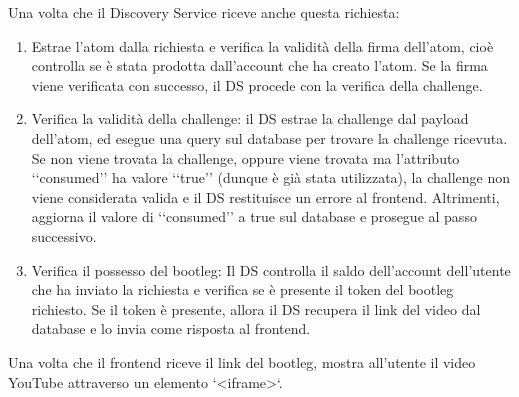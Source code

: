 Una volta che il Discovery Service riceve anche questa richiesta:
\begin{enumerate}
    \item Estrae l'atom dalla richiesta e verifica la validità della firma dell'atom, cioè controlla se è stata prodotta dall'account che ha creato l'atom. Se la firma viene verificata con successo, il DS procede con la verifica della challenge.
    \item Verifica la validità della challenge: il DS estrae la challenge dal payload dell'atom, ed esegue una query sul database per trovare la challenge ricevuta. Se non viene trovata la challenge, oppure viene trovata ma l'attributo ‘‘consumed’’ ha valore ‘‘true’’ (dunque è già stata utilizzata), la challenge non viene considerata valida e il DS restituisce un errore al frontend. Altrimenti, aggiorna il valore di ‘‘consumed’’ a true sul database e prosegue al passo successivo.
    \item Verifica il possesso del bootleg: Il DS controlla il saldo dell'account dell'utente che ha inviato la richiesta e verifica se è presente il token del bootleg richiesto. Se il token è presente, allora il DS recupera il link del video dal database e lo invia come risposta al frontend.
\end{enumerate}

Una volta che il frontend riceve il link del bootleg, mostra all'utente il video YouTube attraverso un elemento `<iframe>`.